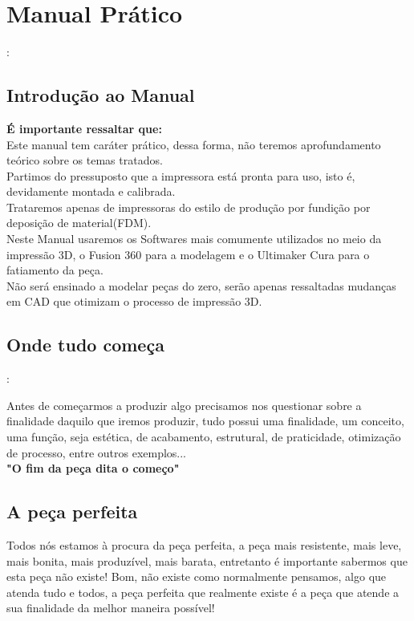 \section{Manual Prático}:
\subsection{Introdução ao Manual}

\textbf{\medium É importante ressaltar que:}\\[0.4cm]



    Este manual tem caráter prático, dessa forma, não teremos aprofundamento teórico sobre os temas tratados.\\[0.3cm]

    Partimos do pressuposto que a impressora está pronta para uso, isto é, devidamente montada e calibrada.\\[0.3cm]

    Trataremos apenas de impressoras do estilo de produção por fundição por deposição de material(FDM).\\[0.3cm]

    Neste Manual usaremos os Softwares mais comumente utilizados no meio da impressão  3D, o Fusion 360 para a modelagem e o Ultimaker Cura para o fatiamento da peça.\\[0.3cm]

    Não será ensinado a modelar peças do zero, serão apenas ressaltadas mudanças em CAD que otimizam o processo de impressão 3D.\\[0.3cm]

\subsection{Onde tudo começa}:

Antes de começarmos a produzir algo precisamos nos questionar sobre a finalidade daquilo que iremos produzir, tudo possui uma finalidade, um conceito, uma função, seja estética, de acabamento, estrutural, de praticidade, otimização de processo, entre outros exemplos...\\[0.5cm]

\textbf{\Large "O fim da peça dita o começo"}

\subsection{A peça perfeita}

Todos nós estamos à procura da peça perfeita, a peça mais resistente, mais leve, mais bonita, mais produzível, mais barata, entretanto é importante sabermos que esta peça não existe! Bom, não existe como normalmente pensamos, algo que atenda tudo e todos, a peça perfeita que realmente existe é a peça que atende a sua finalidade da melhor maneira possível!


